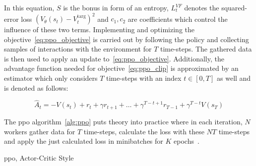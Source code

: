 \documentclass[draft,final]{vutinfth} %
\newcommand{\p}[1]{see p. #1}
\begin{document}
    In this equation, $S$ is the bonus in form of an entropy, $L_t^{VF}$ denotes the squared-error loss $(V_\theta(s_t)-V_t^{\text{targ}})^2$ and $c_1,c_2$ are coefficients which control the influence of these two terms.
    Implementing and optimizing the objective~\ref{eq:ppo_objective} is carried out by following the policy and collecting samples of interactions with the environment for $T$ time-steps.
    The gathered data is then used to apply an update to~\ref{eq:ppo_objective}.
    Additionally, the advantage function needed for objective~\ref{eq:ppo_clip} is approximated by an estimator which only considers $T$ time-steps with an index $t\in [0,T]$ as well and is denoted as follows:

    \begin{equation}
        \hat{A}_t=-V(s_t)+r_t+\gamma r_{t+1} + \dots + \gamma^{T-t+1}r_{T-1} + \gamma^{T-t}V(s_T)\label{eq:advantage_estimator}
    \end{equation}

    The \gls{ppo} algorithm~\eqref{alg:ppo} puts theory into practice where in each iteration, $N$ workers gather data for $T$ time-steps, calculate the loss with these $NT$ time-steps and apply the just calculated loss in minibatches for $K$ epochs~\citep{francois-lavet_introduction_2018}.
    \newpage
    \begin{algorithm}
        \caption[\acrlong{ppo}, Actor-Critic Style]{\gls{ppo}, Actor-Critic Style\protect\footnotemark}
        \label{alg:ppo}




    \end{algorithm}

    \footnotetext{\citep[\p{5}]{schulman_proximal_2017}}

    \glsresetall
\end{document}
